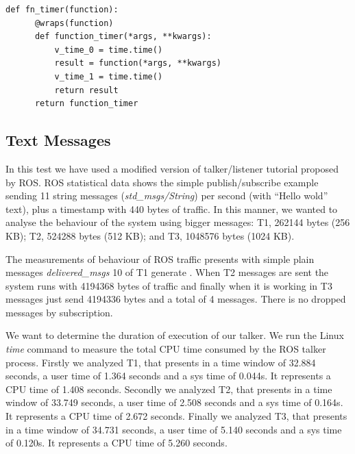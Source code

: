 \documentclass[journal,twoside]{JoPhA}
\begin{document}
{
  \footnotesize{
    \begin{Verbatim}[frame=single]
def fn_timer(function):
	  @wraps(function)
	  def function_timer(*args, **kwargs):
	      v_time_0 = time.time()
	      result = function(*args, **kwargs)
	      v_time_1 = time.time()
	      return result
	  return function_timer
    \end{Verbatim}
  }
}


\subsection{Text Messages}

In this test we have used a modified version of talker/listener tutorial proposed by ROS. 
ROS statistical data shows the simple publish/subscribe example sending 11 string messages ({\em std\_msgs/String}) per second (with ``Hello wold'' text), plus a timestamp with 440 bytes of traffic.
In this manner, we wanted to analyse the behaviour of the system using bigger messages: T1, 262144 bytes (256 KB); T2, 524288 bytes (512 KB); and T3, 1048576 bytes (1024 KB).

The measurements of behaviour of ROS traffic presents with simple plain messages {\em delivered\_msgs} 10 of T1 generate . When T2 messages are sent the system runs with 4194368 bytes of traffic and finally when it is working in  T3 messages just send 4194336 bytes and a total of 4 messages. There is no dropped messages by subscription.

We want to determine the duration of execution of our talker. We run the Linux {\em time} command to measure the total CPU time consumed by the ROS talker process. 
Firstly we analyzed T1, that presents in a time window of 32.884 seconds, a user time of  1.364 seconds and a sys time of 0.044s. It represents a CPU time of 1.408 seconds.
Secondly we analyzed T2, that presents in a time window of 33.749 seconds, a user time of  2.508 seconds and a sys time of 0.164s. It represents a CPU time of 2.672 seconds.
Finally we analyzed T3, that presents in a time window of 34.731 seconds, a user time of  5.140 seconds and a sys time of 0.120s. It represents a CPU time of 5.260 seconds.
\end{document}
